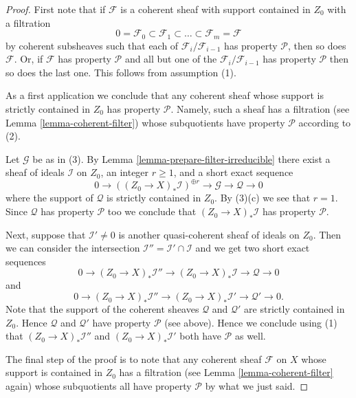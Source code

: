 \documentclass[10pt,a4paper]{amsart}
\theoremstyle{plain}
\theoremstyle{definition}
\theoremstyle{remark}
\numberwithin{equation}{subsection}
\begin{document}
\begin{proof}
First note that if $\mathcal{F}$ is a coherent sheaf with support
contained in $Z_0$ with a filtration
$$
0 = \mathcal{F}_0 \subset \mathcal{F}_1 \subset
\ldots \subset \mathcal{F}_m = \mathcal{F}
$$
by coherent subsheaves such that each of $\mathcal{F}_i/\mathcal{F}_{i - 1}$
has property $\mathcal{P}$, then so does $\mathcal{F}$. Or, if $\mathcal{F}$
has property $\mathcal{P}$ and all but one of the
$\mathcal{F}_i/\mathcal{F}_{i - 1}$ has property $\mathcal{P}$ then
so does the last one. This follows from assumption (1).

\medskip\noindent
As a first application we conclude that any coherent sheaf whose support
is strictly contained in $Z_0$ has property $\mathcal{P}$. Namely, such a
sheaf has a filtration (see Lemma \ref{lemma-coherent-filter})
whose subquotients have property $\mathcal{P}$ according to (2).

\medskip\noindent
Let $\mathcal{G}$ be as in (3). By Lemma \ref{lemma-prepare-filter-irreducible}
there exist a sheaf of ideals $\mathcal{I}$ on $Z_0$, an
integer $r \geq 1$, and a short exact sequence
$$
0 \to
\left((Z_0 \to X)_*\mathcal{I}\right)^{\oplus r} \to
\mathcal{G} \to
\mathcal{Q} \to 0
$$
where the support of $\mathcal{Q}$ is strictly contained in $Z_0$.
By (3)(c) we see that $r = 1$. Since $\mathcal{Q}$ has property $\mathcal{P}$
too we conclude that $(Z_0 \to X)_*\mathcal{I}$ has property
$\mathcal{P}$.

\medskip\noindent
Next, suppose that $\mathcal{I}' \not = 0$ is another quasi-coherent
sheaf of ideals on $Z_0$. Then we can consider the intersection
$\mathcal{I}'' = \mathcal{I}' \cap \mathcal{I}$ and we get
two short exact sequences
$$
0 \to
(Z_0 \to X)_*\mathcal{I}'' \to
(Z_0 \to X)_*\mathcal{I} \to
\mathcal{Q} \to 0
$$
and
$$
0 \to
(Z_0 \to X)_*\mathcal{I}'' \to
(Z_0 \to X)_*\mathcal{I}' \to
\mathcal{Q}' \to 0.
$$
Note that the support of the coherent sheaves $\mathcal{Q}$ and
$\mathcal{Q}'$ are strictly contained in $Z_0$.
Hence $\mathcal{Q}$ and $\mathcal{Q}'$ have property $\mathcal{P}$
(see above). Hence we conclude using (1)
that $(Z_0 \to X)_*\mathcal{I}''$ and $(Z_0 \to X)_*\mathcal{I}'$
both have $\mathcal{P}$ as well.

\medskip\noindent
The final step of the proof is to note that any coherent sheaf
$\mathcal{F}$ on $X$ whose support is contained in $Z_0$ has a filtration
(see Lemma \ref{lemma-coherent-filter} again) whose subquotients
all have property $\mathcal{P}$ by what we just said.
\end{proof}
\end{document}
